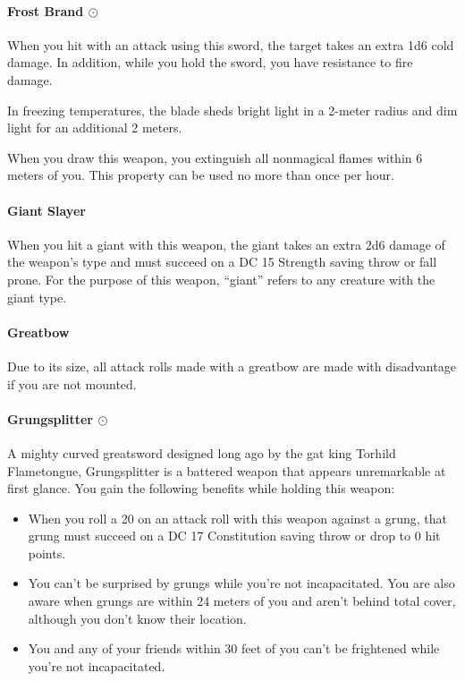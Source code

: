     \paragraph{Frost Brand $\odot$}
        When you hit with an attack using this sword, the target takes an extra 1d6 cold damage.
        In addition, while you hold the sword, you have resistance to fire damage.

        In freezing temperatures, the blade sheds bright light in a 2-meter radius and dim light for an additional 2 meters.

        When you draw this weapon, you extinguish all nonmagical flames within 6 meters of you.
        This property can be used no more than once per hour.
    \paragraph{Giant Slayer}
        When you hit a giant with this weapon, the giant takes an extra 2d6 damage of the weapon's type and must succeed on a DC 15 Strength saving throw or fall prone.
        For the purpose of this weapon, ``giant'' refers to any creature with the giant type.
    \paragraph{Greatbow}
        Due to its size, all attack rolls made with a greatbow are made with disadvantage if you are not mounted.
    \paragraph{Grungsplitter $\odot$}
        A mighty curved greatsword designed long ago by the gat king Torhild Flametongue, Grungsplitter is a battered weapon that appears unremarkable at first glance.
        You gain the following benefits while holding this weapon:
        \begin{itemize}
            \item When you roll a 20 on an attack roll with this weapon against a grung, that grung must succeed on a DC 17 Constitution saving throw or drop to 0 hit points.
            \item You can't be surprised by grungs while you're not incapacitated.
            You are also aware when grungs are within 24 meters of you and aren't behind total cover, although you don't know their location.
            \item You and any of your friends within 30 feet of you can't be frightened while you're not incapacitated.
        \end{itemize}
